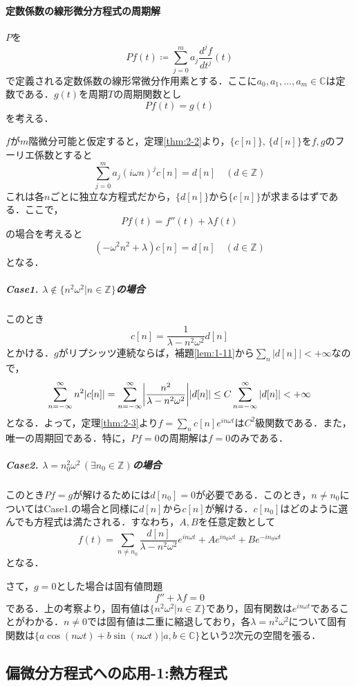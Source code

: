 \documentclass[dvipdfmx,a4j,10pt]{jsarticle}
\theoremstyle{mystyle1}
\theoremstyle{mystyle3}
\theoremstyle{mystyle4}
\theoremstyle{mystyle2}
\begin{document}
\paragraph{定数係数の線形微分方程式の周期解}

$P$を
\[
    Pf(t)\coloneqq\sum_{j=0}^m a_j\frac{d^j f}{dt^j}(t)
\]
で定義される定数係数の線形常微分作用素とする．ここに$a_0,a_1,\ldots,a_m\in\mathbb{C}$は定数である．$g(t)$を周期$T$の周期関数とし
\[
    Pf(t)=g(t)
\]
を考える．

$f$が$m$階微分可能と仮定すると，定理\ref{thm:2-2}より，$\{c[n]\},\,\{d[n]\}$を$f,g$のフーリエ係数とすると
\[
    \sum_{j=0}^m a_j(i\omega n)^j c[n]=d[n]\quad(d\in\mathbb{Z})
\]
これは各$n$ごとに独立な方程式だから，$\{d[n]\}$から$\{c[n]\}$が求まるはずである．ここで，
\[
    Pf(t)=f''(t)+\lambda f(t)
\]
の場合を考えると
\[
    (-\omega^2 n^2+\lambda)c[n]=d[n]\quad(d\in\mathbb{Z})
\]
となる．

\subparagraph{Case1. $\lambda\notin\{n^2\omega^2|n\in\mathbb{Z}\}$の場合}

このとき
\[
    c[n]=\frac{1}{\lambda-n^2\omega^2}d[n]
\]
とかける．$g$がリプシッツ連続ならば，補題\ref{lem:1-11}から$\sum_n |d[n]|<+\infty$なので，
\[
    \sum_{n=-\infty}^\infty n^2|c[n]|=\sum_{n=-\infty}^\infty\mleft|\frac{n^2}{\lambda-n^2\omega^2}\mright||d[n]|\leq C\sum_{n=-\infty}^\infty|d[n]|<+\infty
\]
となる．よって，定理\ref{thm:2-3}より$f=\sum_n c[n]e^{in\omega t}$は$C^2$級関数である．また，唯一の周期回である．特に，$Pf=0$の周期解は$f=0$のみである．

\subparagraph{Case2. $\lambda=n_0^2\omega^2\,(\exists n_0\in\mathbb{Z})$の場合}

このとき$Pf=g$が解けるためには$d[n_0]=0$が必要である．このとき，$n\neq n_0$についてはCase1.の場合と同様に$d[n]$から$c[n]$が解ける．$c[n_0]$はどのように選んでも方程式は満たされる．すなわち，$A,B$を任意定数として
\[
    f(t)=\sum_{n\neq n_0}\frac{d[n]}{\lambda-n^2\omega^2}e^{in\omega t}+Ae^{in_0\omega t}+Be^{-in_0\omega t}
\]
となる．

さて，$g=0$とした場合は固有値問題
\[
    f''+\lambda f=0
\]
である．上の考察より，固有値は$\{n^2\omega^2 | n\in\mathbb{Z}\}$であり，固有関数は$e^{in\omega t}$であることがわかる．$n\neq 0$では固有値は二重に縮退しており，各$\lambda=n^2\omega^2$について固有関数は$\{a\cos(n\omega t)+b\sin(n\omega t)|a,b\in\mathbb{C}\}$という2次元の空間を張る．


\subsection{偏微分方程式への応用-1:熱方程式}
\end{document}
